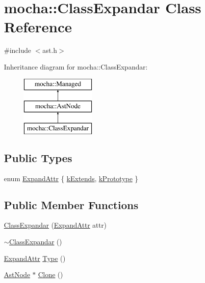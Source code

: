 \hypertarget{classmocha_1_1_class_expandar}{
\section{mocha::ClassExpandar Class Reference}
\label{classmocha_1_1_class_expandar}
}


{\ttfamily \#include $<$ast.h$>$}

Inheritance diagram for mocha::ClassExpandar:\begin{figure}[H]
\begin{center}
\leavevmode
\includegraphics[height=3.000000cm]{classmocha_1_1_class_expandar}
\end{center}
\end{figure}
\subsection*{Public Types}
\begin{DoxyCompactItemize}
\item 
enum \hyperlink{classmocha_1_1_class_expandar_ab2e8fbff2016d78e9eb128f90e1fc7df}{ExpandAttr} \{ \hyperlink{classmocha_1_1_class_expandar_ab2e8fbff2016d78e9eb128f90e1fc7dfaf61e7f3912848c1da2126eb296ae0da9}{kExtends}, 
\hyperlink{classmocha_1_1_class_expandar_ab2e8fbff2016d78e9eb128f90e1fc7dfafc78d230a7579d6ad8ff7bc317f59078}{kPrototype}
 \}
\end{DoxyCompactItemize}
\subsection*{Public Member Functions}
\begin{DoxyCompactItemize}
\item 
\hyperlink{classmocha_1_1_class_expandar_a0c6019411ac6660872e460d0768613e7}{ClassExpandar} (\hyperlink{classmocha_1_1_class_expandar_ab2e8fbff2016d78e9eb128f90e1fc7df}{ExpandAttr} attr)
\item 
\hyperlink{classmocha_1_1_class_expandar_a87db54a95c1341d9c547388a7ceffd48}{$\sim$ClassExpandar} ()
\item 
\hyperlink{classmocha_1_1_class_expandar_ab2e8fbff2016d78e9eb128f90e1fc7df}{ExpandAttr} \hyperlink{classmocha_1_1_class_expandar_a3ecc25d967144064854cd79317b3cebc}{Type} ()
\item 
\hyperlink{classmocha_1_1_ast_node}{AstNode} $\ast$ \hyperlink{classmocha_1_1_class_expandar_a0942e40301ca95fb470443801da7c837}{Clone} ()
\end{DoxyCompactItemize}
